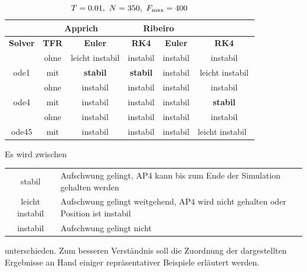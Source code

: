 \begin{table}[htbp]
	\centering
		\begin{tabular}{c|c|c|c|c|c}
			\rowcolor[gray]{0.9}
			\multicolumn{2}{c|}{\textbf{Simulation}} & \multicolumn{2}{c|}{\textbf{Apprich}} & \multicolumn{2}{c}{\textbf{Ribeiro}} \\
			\midrule
			\rowcolor[gray]{0.9}
			\textbf{Solver} & \textbf{TFR} & \textbf{Euler} & \textbf{RK4} & \textbf{Euler} & \textbf{RK4} \\
			\midrule
			\cellcolor[gray]{0.9}  											& \cellcolor[gray]{.9}ohne & leicht instabil & instabil       & instabil & instabil\\
			\multirow{-2}{*}{\cellcolor[gray]{.9}ode1}	& \cellcolor[gray]{.9}mit  & \textbf{stabil} & \textbf{stabil} & instabil & leicht instabil\\
			\midrule
			\cellcolor[gray]{0.9}  											& \cellcolor[gray]{.9}ohne    & instabil	&  instabil & instabil & instabil\\
			\multirow{-2}{*}{\cellcolor[gray]{.9}ode4}	& \cellcolor[gray]{.9}mit     & instabil  & instabil  & instabil & \textbf{stabil}\\
			\midrule	
			\cellcolor[gray]{0.9}  											& \cellcolor[gray]{.9}ohne    & instabil &  instabil    & instabil 	& instabil\\
			\multirow{-2}{*}{\cellcolor[gray]{.9}ode45}	& \cellcolor[gray]{.9}mit     & instabil &  instabil    & instabil 	& leicht instabil\																											
		\end{tabular}
	\caption{$T=0.01, \ N=350, \ F_{\mrm{max}}=400$}
	\label{tab:T001N350Fmax400}
\end{table}

Es wird zwischen 

\begin{center}
	\begin{tabular}{cl}
		stabil & Aufschwung gelingt, AP4 kann bis zum Ende der Simulation gehalten werden \\
		leicht instabil & Aufschwung gelingt weitgehend, AP4 wird nicht gehalten oder Position ist instabil  \\
		instabil & Aufschwung gelingt nicht \\
	\end{tabular}
\end{center}

unterschieden. Zum besseren Verständnis soll die Zuordnung der dargestellten Ergebnisse an Hand einiger repräsentativer Beispiele erläutert werden.

